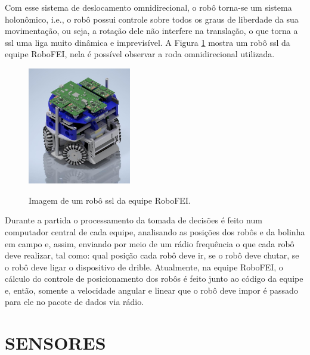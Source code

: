 \documentclass[acronym, symbols]{fei}
\begin{document}
		Com esse sistema de deslocamento omnidirecional, o robô torna-se um sistema holonômico, i.e., o robô possui controle sobre todos os graus de liberdade da sua movimentação, ou seja, a rotação dele não interfere na translação, o que torna a \acrshort{ssl} uma liga muito dinâmica e imprevisível. A Figura \ref{fig:exemplo_robo_ssl} mostra um robô \acrshort{ssl} da equipe RoboFEI, nela é possível observar a roda omnidirecional utilizada.
		
		\begin{figure}[!htb]
			\centering
			\caption{Imagem de um robô \acrshort{ssl} da equipe RoboFEI.} 
			\includegraphics[width=0.4\textwidth]{Foto_Robo_2012.jpg}
			\label{fig:exemplo_robo_ssl}
		\end{figure}
		
		Durante a partida o processamento da tomada de decisões é feito num computador central de cada equipe, analisando as posições dos robôs e da bolinha em campo e, assim, enviando por meio de um rádio frequência o que cada robô deve realizar, tal como: qual posição cada robô deve ir, se o robô deve chutar, se o robô deve ligar o dispositivo de drible. Atualmente, na equipe RoboFEI, o cálculo do controle de posicionamento dos robôs é feito junto ao código da equipe e, então, somente a velocidade angular e linear que o robô deve impor é passado para ele no pacote de dados via rádio.

		
	\section{SENSORES} \label{sec:sensores}
	
\end{document}
